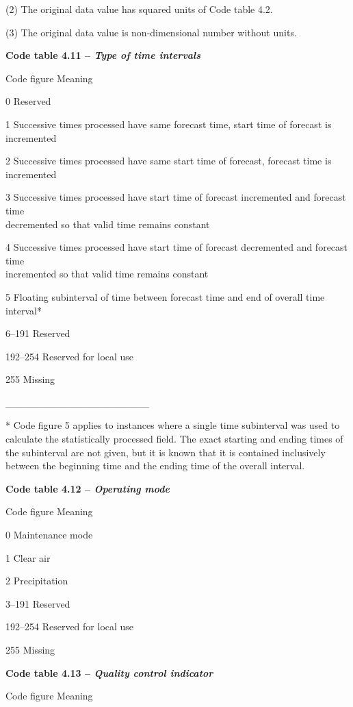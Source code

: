 (2) The original data value has squared units of Code table 4.2.

(3) The original data value is non-dimensional number without units.

\textbf{Code table 4.11 -- \emph{Type of time intervals}}

Code figure Meaning

0 Reserved

1 Successive times processed have same forecast time, start time of forecast is\\
incremented

2 Successive times processed have same start time of forecast, forecast time is\\
incremented

3 Successive times processed have start time of forecast incremented and forecast time\\
decremented so that valid time remains constant

4 Successive times processed have start time of forecast decremented and forecast time\\
incremented so that valid time remains constant

5 Floating subinterval of time between forecast time and end of overall time interval*

6--191 Reserved

192--254 Reserved for local use

255 Missing

\_\_\_\_\_\_\_\_\_\_\_\_\_\_\_\_\_\_\_\_

* Code figure 5 applies to instances where a single time subinterval was used to calculate the statistically processed field. The exact starting and ending times of the subinterval are not given, but it is known that it is contained inclusively between the beginning time and the ending time of the overall interval.

\textbf{Code table 4.12 -- \emph{Operating mode}}

Code figure Meaning

0 Maintenance mode

1 Clear air

2 Precipitation

3--191 Reserved

192--254 Reserved for local use

255 Missing

\textbf{Code table 4.13 -- \emph{Quality control indicator}}

Code figure Meaning

